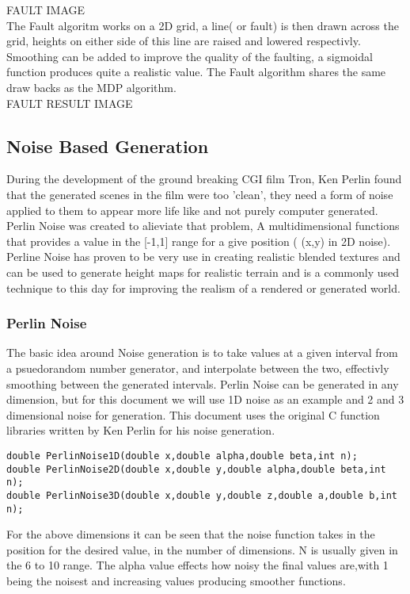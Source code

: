 FAULT IMAGE\\

The Fault algoritm works on a 2D grid, a line( or fault) is then drawn across the
grid, heights on either side of this line are raised and lowered respectivly.
Smoothing can be added to improve the quality of the faulting, a sigmoidal 
function produces quite a realistic value. The Fault algorithm shares the same
draw backs as the MDP algorithm.\\

FAULT RESULT IMAGE\\

\subsection{Noise Based Generation}
During the development of the ground breaking CGI film Tron, Ken Perlin found 
that the generated scenes in the film were too 'clean', they need a form of noise
applied to them to appear more life like and not purely computer generated. 
Perlin Noise was created to alieviate that problem, A multidimensional functions
that provides a value in the [-1,1] range for a give position ( (x,y) in 2D 
noise). Perline Noise has proven to be very use in creating realistic blended 
textures and can be used to generate height maps for realistic terrain and is a 
commonly used technique to this day for improving the realism of a rendered or
generated world.\\

\subsubsection*{Perlin Noise}
The basic idea around Noise generation is to take values at a given interval from
a psuedorandom number generator, and interpolate between the two, effectivly 
smoothing between the generated intervals. Perlin Noise can be generated in any
dimension, but for this document we will use 1D noise as an example and 2 and 
3 dimensional noise for generation. This document uses the original C function
libraries written by Ken Perlin for his noise generation.\\ 

\begin{lstlisting}
double PerlinNoise1D(double x,double alpha,double beta,int n);
double PerlinNoise2D(double x,double y,double alpha,double beta,int n);
double PerlinNoise3D(double x,double y,double z,double a,double b,int n);
\end{lstlisting}

For the above dimensions it can be seen that the noise function takes in the 
position for the desired value, in the number of dimensions. N is usually given
in the 6 to 10 range. The alpha value effects how noisy the final values are,with
1 being the noisest and increasing values producing smoother functions.\\

